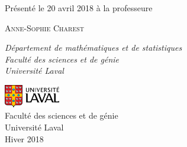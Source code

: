 \begin{titlepage}
	Présenté le 20 avril 2018 à la professeure
	
	\vspace{0.5\baselineskip} %
	
	{\scshape\Large Anne-Sophie Charest \\} %
	
	\vspace{0.5\baselineskip} %
	
	\textit{Département de mathématiques et de statistiques\\Faculté des sciences et de génie\\Université Laval} %
	
	\vfill %
	
	
        
        \includegraphics[height=1cm]{UL_P.pdf}\\
        Faculté des sciences et de génie\\
        Université Laval\\
        Hiver 2018       
\end{titlepage}
